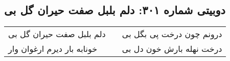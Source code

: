 \begin{center}
\section*{دوبیتی شماره ۳۰۱: دلم بلبل صفت حیران گل بی}
\label{sec:301}
\begin{longtable}{l p{0.5cm} r}
دلم بلبل صفت حیران گل بی
&&
درونم چون درخت پی بگل بی
\\
خونابه بار دیرم ارغوان وار
&&
درخت نهله بارش خون دل بی
\\
\end{longtable}
\end{center}
